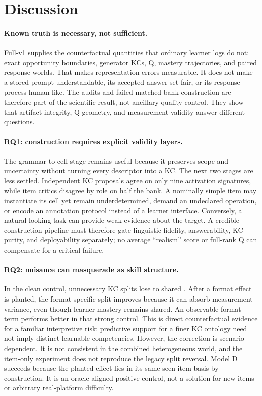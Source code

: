 \section{Discussion}

\paragraph{Known truth is necessary, not sufficient.}
Full-v1 supplies the counterfactual quantities that ordinary learner logs do
not: exact opportunity boundaries, generator KCs, Q, mastery trajectories, and
paired response worlds.  That makes representation errors measurable.  It does
not make a stored prompt understandable, its accepted-answer set fair, or its
response process human-like.  The audits and failed matched-bank construction
are therefore part of the scientific result, not ancillary quality control.
They show that artifact integrity, Q geometry, and measurement validity answer
different questions.

\paragraph{RQ1: construction requires explicit validity layers.}
The grammar-to-cell stage remains useful because it preserves scope and
uncertainty without turning every descriptor into a KC.  The next two stages
are less settled.  Independent KC proposals agree on only nine activation
signatures, while item critics disagree by role on half the bank.  A nominally
simple item may instantiate its cell yet remain underdetermined, demand an
undeclared operation, or encode an annotation protocol instead of a learner
interface.  Conversely, a natural-looking task can provide weak evidence about
the target.  A credible construction pipeline must therefore gate linguistic
fidelity, answerability, KC purity, and deployability separately; no average
``realism'' score or full-rank Q can compensate for a critical failure.

\paragraph{RQ2: nuisance can masquerade as skill structure.}
In the clean control, unnecessary KC splits lose to shared \kstar{}.  After a
format effect is planted, the format-specific split improves because it can
absorb measurement variance, even though learner mastery remains shared.  An
observable format term performs better in that strong control.  This is direct
counterfactual evidence for a familiar interpretive risk: predictive support
for a finer KC ontology need not imply distinct learnable competencies.
However, the correction is scenario-dependent.  It is not consistent in the
combined heterogeneous world, and the item-only experiment does not reproduce
the legacy split reversal.  Model D succeeds because the planted effect lies
in its same-seen-item basis by construction.  It is an oracle-aligned positive
control, not a solution for new items or arbitrary real-platform difficulty.

